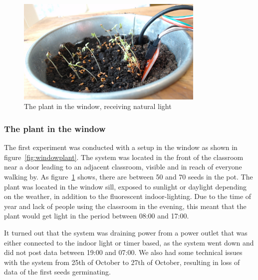 \begin{figure}
\centering
\includegraphics[width=0.8\textwidth]{img/empiricalsetting/windowsystem.jpg}
\caption{The plant in the window, receiving natural light}
\label{fig:windowsystemplant}
\end{figure}

\subsubsection*{The plant in the window}
The first experiment was conducted with a setup in the window as shown in figure~\ref{fig:windowplant}. The system was located in the front of the classroom near a door leading to an adjacent classroom, visible and in reach of everyone walking by. As figure~\ref{fig:windowsystemplant} shows, there are between 50 and 70 seeds in the pot. The plant was located in the window sill, exposed to sunlight or daylight depending on the weather, in addition to the fluorescent indoor-lighting. Due to the time of year and lack of people using the classroom in the evening, this meant that the plant would get light in the period between 08:00 and 17:00.

It turned out that the system was draining power from a power outlet that was either connected to the indoor light or timer based, as the system went down and did not post data between 19:00 and 07:00. We also had some technical issues with the system from 25th of October to 27th of October, resulting in loss of data of the first seeds germinating.


